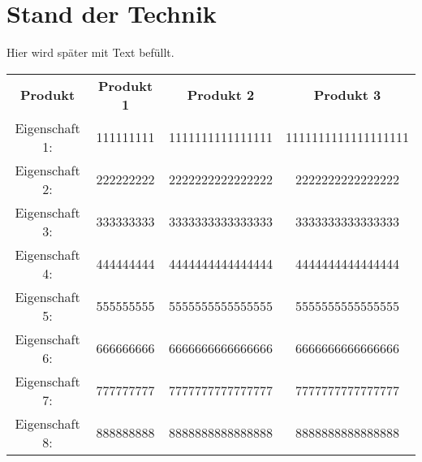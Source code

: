 \section{Stand der Technik}

Hier wird später mit Text befüllt.

\begin {table}
\centering
\begin{tabular}{c|c|c|c}
    \textbf{Produkt} & \textbf{Produkt 1} & \textbf{Produkt 2} & \textbf{Produkt 3} \\
    Eigenschaft 1:   & 111111111          &  1111111111111111  &  1111111111111111111 \\
    Eigenschaft 2:   & 222222222          &  2222222222222222  &  2222222222222222 \\
    Eigenschaft 3:   & 333333333          &  3333333333333333  &  3333333333333333 \\
    Eigenschaft 4:   & 444444444          &  4444444444444444  &  4444444444444444 \\
    Eigenschaft 5:   & 555555555          &  5555555555555555  &  5555555555555555 \\
    Eigenschaft 6:   & 666666666          &  6666666666666666  &  6666666666666666 \\
    Eigenschaft 7:   & 777777777          &  7777777777777777  &  7777777777777777 \\
    Eigenschaft 8:   & 888888888          &  8888888888888888  &  8888888888888888 \\

\end{tabular}
\end {table}